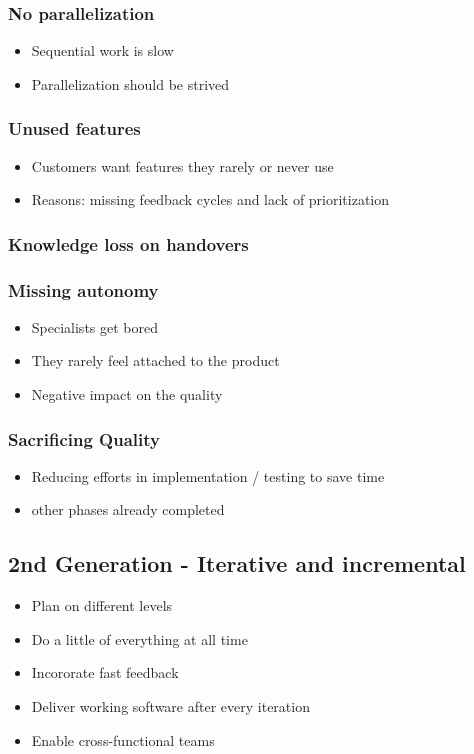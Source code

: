 \subsubsection{No parallelization}
\begin{itemize}
    \item Sequential work is slow
    \item Parallelization should be strived
\end{itemize}
\subsubsection{Unused features}
\begin{itemize}
    \item Customers want features they rarely or never use
    \item Reasons: missing feedback cycles and lack of prioritization
\end{itemize}
\subsubsection{Knowledge loss on handovers}
\subsubsection{Missing autonomy}
\begin{itemize}
    \item Specialists get bored
    \item They rarely feel attached to the product
    \item Negative impact on the quality
\end{itemize}
\subsubsection{Sacrificing Quality}
\begin{itemize}
    \item Reducing efforts in implementation / testing to save time
    \item other phases already completed
\end{itemize}

\subsection{2nd Generation - Iterative and incremental}
\begin{itemize}
    \item Plan on different levels
    \item Do a little of everything at all time
    \item Incororate fast feedback
    \item Deliver working software after every iteration
    \item Enable cross-functional teams
\end{itemize}
